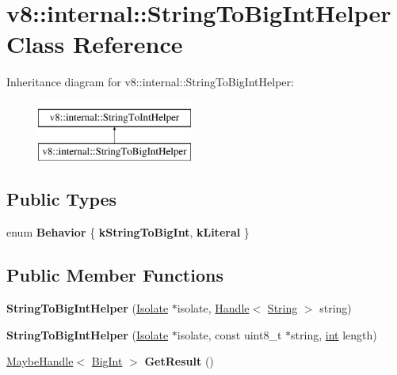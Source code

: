 \hypertarget{classv8_1_1internal_1_1StringToBigIntHelper}{}\section{v8\+:\+:internal\+:\+:String\+To\+Big\+Int\+Helper Class Reference}
\label{classv8_1_1internal_1_1StringToBigIntHelper}
Inheritance diagram for v8\+:\+:internal\+:\+:String\+To\+Big\+Int\+Helper\+:\begin{figure}[H]
\begin{center}
\leavevmode
\includegraphics[height=2.000000cm]{classv8_1_1internal_1_1StringToBigIntHelper}
\end{center}
\end{figure}
\subsection*{Public Types}
\begin{DoxyCompactItemize}
\item 
\mbox{\label{classv8_1_1internal_1_1StringToBigIntHelper_ac785084588fb52aeae2846fcd1246ddc}} 
enum {\bfseries Behavior} \{ {\bfseries k\+String\+To\+Big\+Int}, 
{\bfseries k\+Literal}
 \}
\end{DoxyCompactItemize}
\subsection*{Public Member Functions}
\begin{DoxyCompactItemize}
\item 
\mbox{\label{classv8_1_1internal_1_1StringToBigIntHelper_aaba39837b65cb47512ebf998bb5fc500}} 
{\bfseries String\+To\+Big\+Int\+Helper} (\mbox{\hyperlink{classv8_1_1internal_1_1Isolate}{Isolate}} $\ast$isolate, \mbox{\hyperlink{classv8_1_1internal_1_1Handle}{Handle}}$<$ \mbox{\hyperlink{classv8_1_1internal_1_1String}{String}} $>$ string)
\item 
\mbox{\label{classv8_1_1internal_1_1StringToBigIntHelper_a756e626e313da159705fd88b967b633c}} 
{\bfseries String\+To\+Big\+Int\+Helper} (\mbox{\hyperlink{classv8_1_1internal_1_1Isolate}{Isolate}} $\ast$isolate, const uint8\+\_\+t $\ast$string, \mbox{\hyperlink{classint}{int}} length)
\item 
\mbox{\label{classv8_1_1internal_1_1StringToBigIntHelper_a9645b45e828e3d3e22cb8daef396733e}} 
\mbox{\hyperlink{classv8_1_1internal_1_1MaybeHandle}{Maybe\+Handle}}$<$ \mbox{\hyperlink{classv8_1_1internal_1_1BigInt}{Big\+Int}} $>$ {\bfseries Get\+Result} ()
\end{DoxyCompactItemize}
